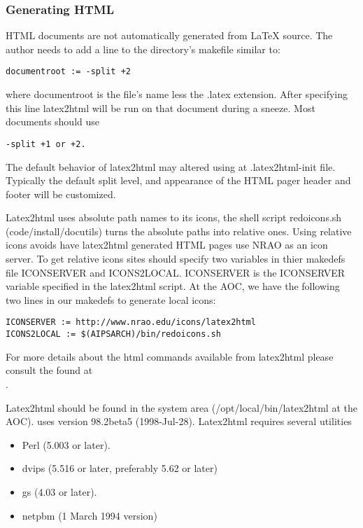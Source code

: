 \subsubsection{Generating HTML}
HTML documents are not automatically generated from LaTeX source.  The author
needs to add a line to the directory's makefile similar to:
\begin{verbatim}
documentroot := -split +2
\end{verbatim}

where documentroot is the file's name less the .latex extension.  After
specifying this line 
latex2html will be run on that document during a sneeze.  Most \aips documents
should use
\begin{verbatim}
-split +1 or +2.
\end{verbatim}


The default behavior of latex2html may altered using at .latex2html-init
file.  Typically the default split level, and appearance of the HTML pager
header and footer will be customized.

Latex2html uses absolute path names to its icons, the shell script
redoicons.sh (code/install/docutils) turns the absolute paths into relative
ones.  Using relative icons avoids have latex2html generated HTML pages
use NRAO as an icon server. To get relative icons sites should specify two
variables in thier makedefs file ICONSERVER and ICONS2LOCAL.  ICONSERVER is
the ICONSERVER variable specified in the latex2html script.  At the AOC,
we have the following two lines in our makedefs to generate local icons:
\begin{verbatim}
ICONSERVER := http://www.nrao.edu/icons/latex2html
ICONS2LOCAL := $(AIPSARCH)/bin/redoicons.sh
\end{verbatim}

For more details about the html commands available from latex2html please 
consult the
found at\\ 
.

Latex2html should be found in the system area (/opt/local/bin/latex2html at the
AOC).  \aips  uses version 98.2beta5 (1998-Jul-28).  Latex2html requires several utilities
\begin{itemize}
\item Perl (5.003 or later).
\item dvips (5.516 or later, preferably 5.62 or later)
\item gs (4.03 or later).
\item netpbm (1 March 1994 version)
\end{itemize}

